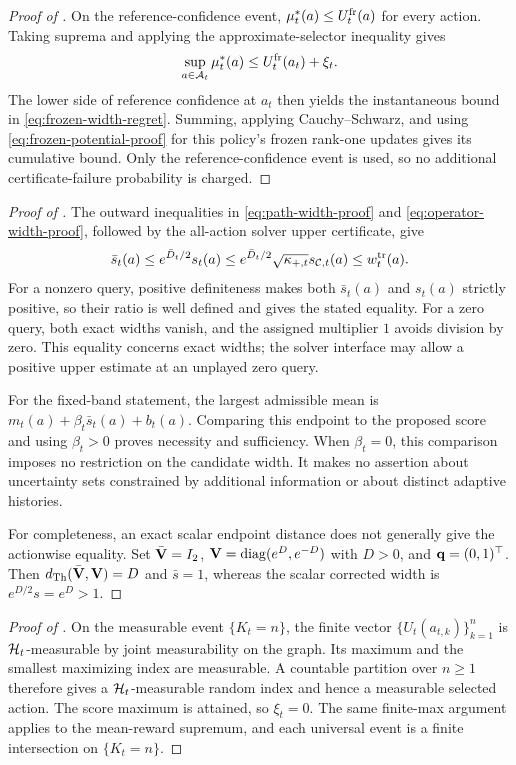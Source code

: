 \begin{proof}[Proof of ]
On the reference-confidence event, $\mu_t^*(a)\le U_t^{\rm fr}(a)$ for
every action.  Taking suprema and applying the approximate-selector inequality
gives
\[
 \sup_{a\in\mathcal{A}_t}\mu_t^*(a)
 \le U_t^{\rm fr}(a_t)+\xi_t.
\]
The lower side of reference confidence at $a_t$ then yields the instantaneous
bound in \eqref{eq:frozen-width-regret}.  Summing, applying Cauchy--Schwarz,
and using \eqref{eq:frozen-potential-proof} for this policy's frozen rank-one
updates gives its cumulative bound.  Only the reference-confidence event is
used, so no additional certificate-failure probability is charged.
\end{proof}

\begin{proof}[Proof of ]
The outward inequalities in \eqref{eq:path-width-proof} and
\eqref{eq:operator-width-proof}, followed by the all-action solver upper
certificate, give
\[
 \bar s_t(a)\le e^{\bar D_t/2}s_t(a)
 \le e^{\bar D_t/2}\sqrt{\kappa_{+,t}}s_{\mathcal{C},t}(a)
 \le w_t^{\rm tr}(a).
\]
For a nonzero query, positive definiteness makes both $\bar s_t(a)$ and
$s_t(a)$ strictly positive, so their ratio is well defined and gives the
stated equality.  For a zero query, both exact widths vanish, and the assigned
multiplier $1$ avoids division by zero.  This equality concerns exact widths;
the solver interface may allow a positive upper estimate at an unplayed zero
query.

For the fixed-band statement, the largest admissible mean is
$m_t(a)+\beta_t\bar s_t(a)+b_t(a)$.  Comparing this endpoint to the proposed
score and using $\beta_t>0$ proves necessity and sufficiency.  When
$\beta_t=0$, this comparison imposes no restriction on the candidate width.
It makes no assertion about uncertainty sets constrained by additional
information or about distinct adaptive histories.

For completeness, an exact scalar endpoint distance does not generally give
the actionwise equality.  Set $\bar{\mathbf{V}}=I_2$,
$\mathbf{V}=\operatorname{diag}(e^D,e^{-D})$ with $D>0$, and
$\mathbf{q}=(0,1)^\top$.  Then $d_{\rm Th}(\bar{\mathbf{V}},\mathbf{V})=D$ and $\bar s=1$,
whereas the scalar corrected width is $e^{D/2}s=e^D>1$.
\end{proof}

\begin{proof}[Proof of ]
On the measurable event $\{K_t=n\}$, the finite vector
$\{U_t(a_{t,k})\}_{k=1}^n$ is $\mathcal{H}_t$-measurable by joint measurability on
the graph.  Its maximum and the smallest maximizing index are measurable.  A
countable partition over $n\ge1$ therefore gives a $\mathcal{H}_t$-measurable random
index and hence a measurable selected action.  The score maximum is attained,
so $\xi_t=0$.  The same finite-max argument applies to the mean-reward supremum,
and each universal event is a finite intersection on $\{K_t=n\}$.
\end{proof}

